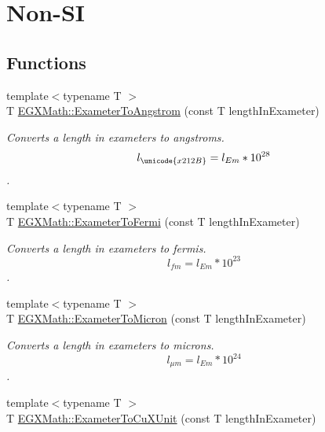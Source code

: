 \hypertarget{group___e_g_x_math-_conversions-_length_conversions-_s_i-_exameter-_non-_s_i}{}\section{Non-\/\+SI}
\label{group___e_g_x_math-_conversions-_length_conversions-_s_i-_exameter-_non-_s_i}
\subsection*{Functions}
\begin{DoxyCompactItemize}
\item 
{\footnotesize template$<$typename T $>$ }\\T \mbox{\hyperlink{group___e_g_x_math-_conversions-_length_conversions-_s_i-_exameter-_non-_s_i_ga24d2ee057470ce37f99d31451e010a22}{E\+G\+X\+Math\+::\+Exameter\+To\+Angstrom}} (const T length\+In\+Exameter)
\begin{DoxyCompactList}\small\item\em Converts a length in exameters to angstroms. \[ l_{\unicode{x212B}}=l_{Em} * 10^{28} \]. \end{DoxyCompactList}\item 
{\footnotesize template$<$typename T $>$ }\\T \mbox{\hyperlink{group___e_g_x_math-_conversions-_length_conversions-_s_i-_exameter-_non-_s_i_ga0aa0524461cbce1fcc102b847545d212}{E\+G\+X\+Math\+::\+Exameter\+To\+Fermi}} (const T length\+In\+Exameter)
\begin{DoxyCompactList}\small\item\em Converts a length in exameters to fermis. \[ l_{fm}=l_{Em} * 10^{23} \]. \end{DoxyCompactList}\item 
{\footnotesize template$<$typename T $>$ }\\T \mbox{\hyperlink{group___e_g_x_math-_conversions-_length_conversions-_s_i-_exameter-_non-_s_i_ga3356bb6585e02757a196b299c29660c1}{E\+G\+X\+Math\+::\+Exameter\+To\+Micron}} (const T length\+In\+Exameter)
\begin{DoxyCompactList}\small\item\em Converts a length in exameters to microns. \[ l_{\mu m}=l_{Em} * 10^{24} \]. \end{DoxyCompactList}\item 
{\footnotesize template$<$typename T $>$ }\\T \mbox{\hyperlink{group___e_g_x_math-_conversions-_length_conversions-_s_i-_exameter-_non-_s_i_gacb2c9fea6b2c2d12ee485f378f5a6af0}{E\+G\+X\+Math\+::\+Exameter\+To\+Cu\+X\+Unit}} (const T length\+In\+Exameter)

\end{DoxyCompactItemize}
